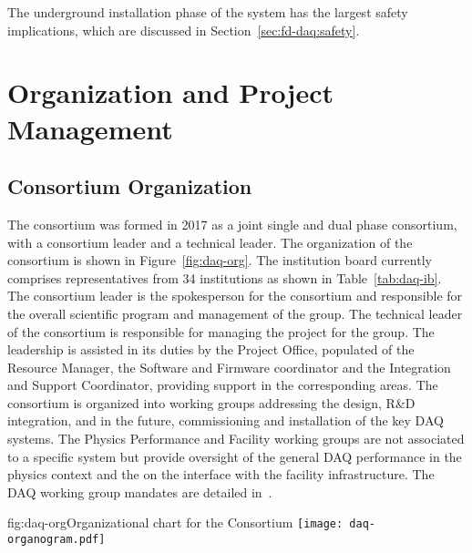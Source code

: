The underground installation phase of the  system has the largest safety
implications, which are discussed in Section~\ref{sec:fd-daq:safety}.

\section{Organization and Project Management}
\label{sec:sp-daq:organization}


\subsection{Consortium Organization}

The  consortium was formed in 2017 as a joint single and
dual phase consortium, with a consortium leader and a technical
leader. The organization of the consortium is shown in
Figure~\ref{fig:daq-org}. The  institution board currently comprises
representatives from 34 institutions as shown in Table~\ref{tab:daq-ib}. The consortium leader is the spokesperson for the consortium and responsible for the overall scientific program and management of the group. The technical leader of the consortium is responsible for
managing the project for the group. The leadership is assisted in its duties by the Project Office, populated of the Resource Manager, the Software and Firmware coordinator and the Integration and Support Coordinator, providing support in the corresponding areas. 
The consortium is organized into working groups addressing the design, R\&D integration, and in the future, commissioning and installation of the key DAQ systems. The Physics Performance and Facility working groups are not associated to a specific system but provide oversight of the general DAQ performance in the physics context and the on the interface with the facility infrastructure. The DAQ working group mandates are detailed in~.

\begin{dunefigure}{fig:daq-org}{Organizational chart for the  Consortium
}
  \texttt{[image: daq-organogram.pdf]}
\end{dunefigure}

